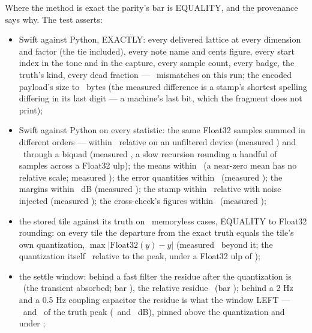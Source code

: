 \documentclass[11pt,a4paper]{article}
\begin{document}
Where the method is exact the parity's bar is EQUALITY, and the provenance
says why. \machineFloorNote{} The test asserts:
{\sloppy
\begin{itemize}
  \item Swift against Python, EXACTLY: every delivered lattice at every
  dimension and factor (the tie included), every note name and cents
  figure, every start index in the tone and in the capture, every sample
  count, every badge, the truth's kind, every dead fraction ---
  \mparityWorstExact\ mismatches on this run; the encoded payload's size
  to \mparityPayloadBytes\ bytes (the measured difference is a stamp's
  shortest spelling differing in its last digit --- a machine's last bit,
  which the fragment does not print);
  \item Swift against Python on every statistic: the same Float32 samples
  summed in different orders --- within \mparitySwiftRelative\ relative on
  an unfiltered device (measured \mparityWorstSwift) and
  \mparitySwiftRelativeFiltered\ through a biquad (measured
  \mparityWorstSwiftFiltered, a slow recursion rounding a handful of
  samples across a Float32 ulp); the means within \mparitySwiftMean\ (a
  near-zero mean has no relative scale; measured \mparityWorstMean); the
  error quantities within \mparitySwiftError\ (measured
  \mparityWorstError); the margins within \mparitySwiftMargin\ dB
  (measured \mparityWorstMargin); the stamp within \mparitySwiftStamp\
  relative with noise injected (measured \mparityWorstStamp); the
  cross-check's figures within \mparitySwiftCross\ (measured
  \mparityWorstCross);
  \item the stored tile against its truth on \mparityMemorylessCount\
  memoryless cases, EQUALITY to Float32 rounding: on every tile the
  departure from the exact truth equals the tile's own quantization,
  $\max|\mathrm{Float32}(y) - y|$ (measured \mparityMemorylessBeyond\
  beyond it; the quantization itself \mparityQuantization\ relative to
  the peak, under a Float32 ulp of \mparityQuantizationBar);
  \item the settle window: behind a fast filter the residue after the
  quantization is \mparityFastBeyond\ (the transient absorbed; bar
  \mparityFastBeyondQuantization), the relative residue
  \mparityFastResidue\ (bar \mparityFastFilter); behind a 2 Hz and a
  0.5 Hz coupling capacitor the residue is what the window LEFT ---
  \mparitySlowTwo\ and \mparitySlowHalf\ of the truth peak
  (\mparitySlowTwoDB\ and \mparitySlowHalfDB\ dB), pinned above the
  quantization and under \mparitySlowCeiling;

\end{itemize}}
\end{document}
